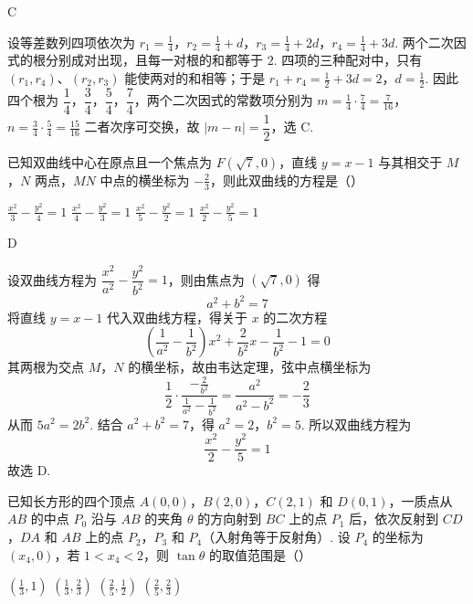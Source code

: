 \begin{answer}
C
\end{answer}

\begin{solution}
设等差数列四项依次为
\(r_1=\frac14\)，\(r_2=\frac14+d\)，\(r_3=\frac14+2d\)，\(r_4=\frac14+3d\).
两个二次因式的根分别成对出现，且每一对根的和都等于 \(2\). 四项的三种配对中，只有 \((r_1,r_4)\)、\((r_2,r_3)\) 能使两对的和相等；于是
\(r_1+r_4=\frac12+3d=2\)，\(d=\frac12\).
因此四个根为 \(\dfrac14\)，\(\dfrac34\)，\(\dfrac54\)，\(\dfrac74\)，两个二次因式的常数项分别为
\(m=\frac14\cdot\frac74=\frac7{16}\)，\(n=\frac34\cdot\frac54=\frac{15}{16}\)
二者次序可交换，故 \(|m-n|=\dfrac12\)，选 C.
\end{solution}

\begin{problem}
已知双曲线中心在原点且一个焦点为 \(F(\sqrt{7}, 0)\)，直线 \(y = x - 1\) 与其相交于 \(M\)，\(N\) 两点，\(MN\) 中点的横坐标为 \(-\frac{2}{3}\)，则此双曲线的方程是（\quad）

\choices
    {\(\frac{x^2}{3} -\frac{y^2}{4} = 1\)}
    {\(\frac{x^2}{4} -\frac{y^2}{3} = 1\)}
    {\(\frac{x^2}{5} -\frac{y^2}{2} = 1\)}
    {\(\frac{x^2}{2} -\frac{y^2}{5} = 1\)}
\end{problem}

\begin{answer}
D
\end{answer}

\begin{solution}
设双曲线方程为 \(\dfrac{x^2}{a^2}-\dfrac{y^2}{b^2}=1\)，则由焦点为 \((\sqrt7,0)\) 得
\[
a^2+b^2=7
\]
将直线 \(y=x-1\) 代入双曲线方程，得关于 \(x\) 的二次方程
\[
\left(\frac1{a^2}-\frac1{b^2}\right)x^2+\frac2{b^2}x-\frac1{b^2}-1=0
\]
其两根为交点 \(M\)，\(N\) 的横坐标，故由韦达定理，弦中点横坐标为
\[
\frac12\cdot\frac{-\frac2{b^2}}{\frac1{a^2}-\frac1{b^2}}=\frac{a^2}{a^2-b^2}=-\frac23
\]
从而 \(5a^2=2b^2\). 结合 \(a^2+b^2=7\)，得 \(a^2=2\)，\(b^2=5\). 所以双曲线方程为
\[
\frac{x^2}{2}-\frac{y^2}{5}=1
\]
故选 D.
\end{solution}

\begin{problem}
已知长方形的四个顶点 \(A(0,0)\)，\(B(2,0)\)，\(C(2,1)\) 和 \(D(0,1)\)，一质点从 \(AB\) 的中点 \(P_0\) 沿与 \(AB\) 的夹角 \(\theta\) 的方向射到 \(BC\) 上的点 \(P_1\) 后，依次反射到 \(CD\)，\(DA\) 和 \(AB\) 上的点 \(P_2\)，\(P_3\) 和 \(P_4\)（入射角等于反射角）. 设 \(P_4\) 的坐标为 \((x_4,0)\)，若 \(1 < x_4 < 2\)，则 \(\tan \theta\) 的取值范围是（\quad）

\choices
    {\(\left(\frac{1}{3}, 1\right)\)}
    {\(\left(\frac{1}{3}, \frac{2}{3}\right)\)}
    {\( \left(\frac{2}{5},\frac{1}{2}\right) \)}
    {\( \left(\frac{2}{5},\frac{2}{3}\right) \)}
\end{problem}

